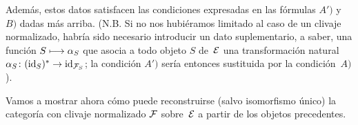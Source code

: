 Además, estos datos satisfacen las condiciones expresadas en las fórmulas
$A')$ y~$B)$ dadas más arriba. (N.B. Si no nos hubiéramos limitado al caso
de un clivaje normalizado, habría sido necesario introducir un dato
suplementario, a saber, una función $S\mto\alpha_S$ que asocia a todo objeto
$S$ de~$\cal{E}$ una transformación natural
$\alpha_S\colon(\id_S)^*\to\id_{\cal{F}_S}$; la condición $A')$ sería
entonces sustituida por la condición~$A)$).

Vamos
a mostrar ahora cómo puede reconstruirse (salvo isomorfismo único) la
categoría con clivaje normalizado $\cal{F}$ sobre~$\cal{E}$ a partir de los
objetos precedentes.
